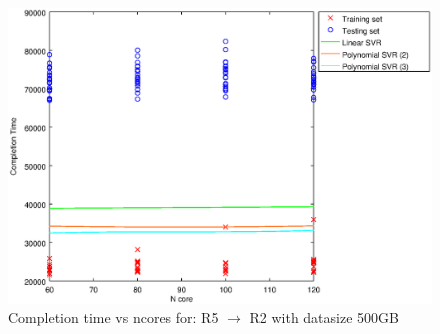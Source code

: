 
\begin {figure}[hbtp]
\centering
\includegraphics[width=\textwidth]{output/R5_R2_500_ALL_FEATURES/plot_R5_R2_500_bestmodels.eps}
\caption{Completion time vs ncores for: R5 $\rightarrow$ R2 with datasize 500GB}
\label{fig:coreonly_linear_R5_R2_500}
\end {figure}
